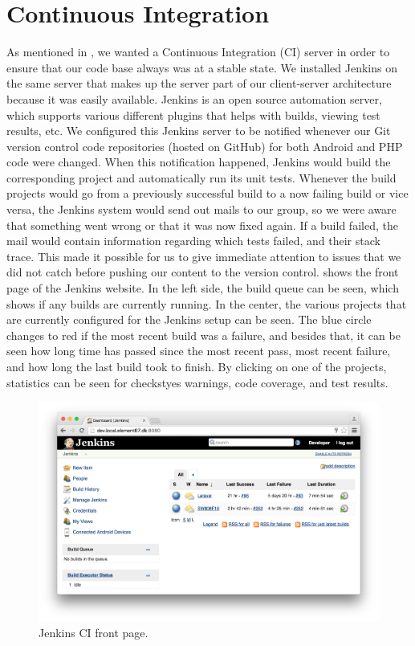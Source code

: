 
\section{Continuous Integration}
\label{sec:continuous_integration}
As mentioned in , we wanted a Continuous Integration (CI) server in order to ensure that our code base always was at a stable state. We installed Jenkins on the same server that makes up the server part of our client-server architecture because it was easily available. Jenkins is an open source automation server, which supports various different plugins that helps with builds, viewing test results, etc. We configured this Jenkins server to be notified whenever our Git version control code repositories (hosted on GitHub) for both Android and PHP code were changed. When this notification happened, Jenkins would build the corresponding project and automatically run its unit tests. Whenever the build projects would go from a previously successful build to a now failing build or vice versa, the Jenkins system would send out mails to our group, so we were aware that something went wrong or that it was now fixed again. If a build failed, the mail would contain information regarding which tests failed, and their stack trace. This made it possible for us to give immediate attention to issues that we did not catch before pushing our content to the version control.  shows the front page of the Jenkins website. In the left side, the build queue can be seen, which shows if any builds are currently running. In the center, the various projects that are currently configured for the Jenkins setup can be seen. The blue circle changes to red if the most recent build was a failure, and besides that, it can be seen how long time has passed since the most recent pass, most recent failure, and how long the last build took to finish. By clicking on one of the projects, statistics can be seen for checkstyes warnings, code coverage, and test results. 

\begin{figure}[!htbp]
    \centering
    \includegraphics[width=\textwidth]{graphic/quality_assurance/jenkins_frontpage}
    \caption{Jenkins CI front page.}
    \label{fig:jenkins_front_page}
\end{figure}
\FloatBarrier

